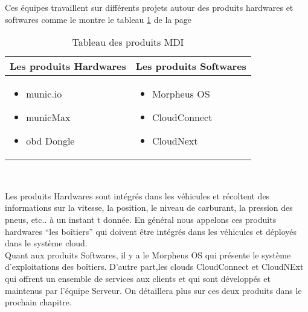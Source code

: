         Ces équipes travaillent sur différents projets autour des produits hardwares et softwares comme le montre le tableau \ref{table:1} de la page \pageref{table:1}
            \begin{table}[h!]
                \centering
                \begin{tabular}{|p{5cm}|p{5cm}|}
                    \hline   Les produits Hardwares & Les produits Softwares \\
                    \hline
                    \begin{itemize}
                        \renewcommand{\labelitemi}{$\bullet$}
                        \item munic.io
                        \item municMax
                        \item \gls{obd} Dongle
                    \end{itemize} 
                   & 
                    \begin{itemize}
                        \renewcommand{\labelitemi}{$\bullet$}
                        \item Morpheus OS
                        \item CloudConnect
                        \item CloudNext
                    \end{itemize}\\
                    \hline 
                \end{tabular}
                \caption{Tableau des produits MDI}
                \label{table:1}
            \end{table} \\

            \vspace{0.3cm}

            Les produits Hardwares sont intégrés dans les véhicules et récoltent des informations sur 
            la vitesse, la position, le niveau de carburant, la pression des pneus, etc..  à un instant t donnée.
            En général nous appelons ces produits hardwares “les boîtiers” qui doivent être intégrés dans 
            les véhicules et déployés  dans le système cloud. \\ [0.1cm]
            Quant aux produits Softwares, il y a le Morpheus OS qui présente le système d'exploitations des boîtiers. 
            D'autre part,les clouds CloudConnect et CloudNExt qui offrent un ensemble de services aux clients 
            et qui sont développés et maintenus par l'équipe Serveur. On détaillera plus sur ces deux produits dans le prochain chapitre. 
       
